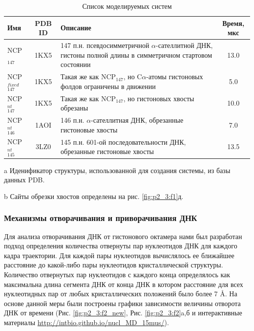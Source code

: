 \begin{table}[p]
\caption{Список моделируемых систем}
\label{tbl:p2_3:systems}
\begin{threeparttable}
\begin{tabular}{lcp{8cm}c}
\hline
\textbf{Имя}& \textbf{PDB ID}\tnote{a} & \textbf{Описание}&\textbf{Время, мкс}\\ \hline\hline
NCP$_{147}$ & 1KX5 & 147 п.н. псевдосимметричной $\alpha$-сателлитной ДНК, гистоны полной длины в симметричном стартовом состоянии & 13.0  \\ \hline
NCP$^{fixed}_{147}$  & 1KX5 & Такая же как NCP$_{147}$, но C$\alpha$-атомы гистоновых фолдов ограничены в движении &  5.0  \\ \hline
NCP$^{nt}_{147}$ & 1KX5 & Такая же как NCP$_{147}$, но гистоновых хвосты обрезаны\tnote{b} &  10.0  \\ \hline
NCP$^{nt}_{146}$ & 1AOI & 146 п.н. $\alpha$-сателлитная ДНК, обрезанные гистоновые хвосты\tnote{b} & 7.0 \\ \hline
NCP$^{nt}_{145}$ & 3LZ0 & 145 п.н. 601-ой последовательности ДНК, обрезанные гистоновые хвосты\tnote{b} & 13.5  \\ \hline
\end{tabular}
\begin{tablenotes}
     \item[a] Иденификатор структуры, использованной для создания системы, из базы данных PDB.
     \item[b] Сайты обрезки хвостов определены на рис. \ref{fig:p2_3:f1}д.
   \end{tablenotes}
\end{threeparttable}
\end{table}


\subsubsection{Механизмы отворачивания и приворачивания ДНК}

Для анализа отворачивания ДНК от гистонового октамера нами был разработан подход определения количества отвернуты пар нуклеотидов ДНК для каждого кадра траектории. Для каждой пары нуклеотидов вычислялось ее ближайшее расстояние до какой-либо пары нуклеотидов кристаллической структуры. Количество отвернутых пар нуклеотидов с каждого конца определялось как максимальна длина сегмента ДНК от конца ДНК в котором расстояние для всех нуклеотидных пар от любых кристаллических положений было более 7 \AA. На основе данной меры были построены графики зависимости величины отворота ДНК от времени (Рис. \ref{fig:p2_3:f2_new}, Рис. \ref{fig:p2_3:f2}a,б и интерактивные материалы \url{http://intbio.github.io/nucl_MD_15mus/}).

